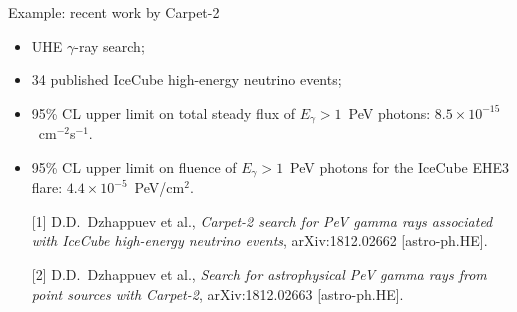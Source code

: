 

\begin{frame}{Example: recent work by Carpet-2}
    \begin{itemize}
	\item UHE $\gamma$-ray search;
        \item 34 published IceCube high-energy neutrino events;
        \item 95\% CL upper limit on total steady flux of $E_{\gamma} > 1$~PeV photons: $8.5 \times 10^{-15}$~cm$^{-2}$s$^{-1}$.
        \item 95\% CL upper limit on fluence of $E_{\gamma} > 1$~PeV photons for the IceCube EHE3 flare: $4.4 \times 10^{-5}$~PeV/cm$^2$.
    \end{itemize}
    \hrulefill
    \small
    \begin{itemize}
        \item[{[1]}] D.D.~Dzhappuev et al., \textit{Carpet-2 search for PeV gamma rays associated with IceCube high-energy neutrino events}, arXiv:1812.02662 [astro-ph.HE].
        \item[{[2]}] D.D.~Dzhappuev et al., \textit{Search for astrophysical PeV gamma rays from point sources with Carpet-2}, arXiv:1812.02663 [astro-ph.HE].
    \end{itemize}
\end{frame}
